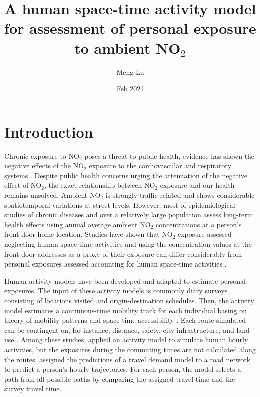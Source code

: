 \documentclass[]{article}
\author{Meng Lu }
\date{Feb 2021}
\title{A human space-time activity model for assessment of personal exposure to ambient NO$_2$}
\begin{document}
\maketitle
 
\section{Introduction}

Chronic exposure to NO$_2$ poses a threat to public health, evidence has shown the negative effects of the NO$_2$ exposure to the cardiovascular and respiratory systems \citep{luo2016acute}. Despite public health concerns urging the attenuation of the negative effect of NO$_2$, the exact relationship between NO$_2$ exposure and our health remains unsolved. Ambient NO$_2$ is strongly traffic-related and shows considerable spatiotemporal variations at street levels. However, most of epidemiological studies of chronic diseases and over a relatively large population assess long-term health effects using annual average ambient NO$_2$ concentrations at a person’s front-door home location. Studies have shown that NO$_2$ exposure assessed neglecting human space-time activities and using the concentration values at the front-door addresses as a proxy of their exposure can differ considerably from personal exposures assessed accounting for human space-time activities \citep{lu2019activity,park2017individual}. 

Human activity models \citep{miller2003prototype, shekarrizfard2017regional, deffner2016personal,gulliver2005time} have been developed and adapted to estimate personal exposures. The input of these activity models is commonly diary surveys consisting of locations visited and origin-destination schedules. Then, the activity model estimates a continuous-time mobility track for each individual basing on theory of mobility patterns and space-time accessibility \citep{nguyen2011steps,gonzalez2008understanding,yang2010using,yu2006spatio,alessandretti2017multi,miller1991modelling}. Each route simulated can be contingent on, for instance, distance, safety, city infrastructure, and land use \citep{law2014measuring}. Among these studies, \cite{beckx2009dynamic} applied an activity model \citep{ALBATROSS} to simulate human hourly activities, but the exposures during the commuting times are not calculated along the routes. \cite{shekarrizfard2017regional} assigned the predictions of a travel demand model to a road network to predict a person's hourly trajectories. For each person, the model selects a path from all possible paths by comparing the assigned travel time and the survey travel time.
\end{document}
